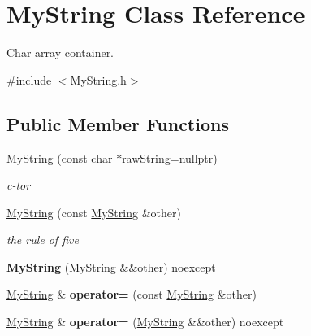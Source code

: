 \hypertarget{classMyString}{\section{My\-String Class Reference}
\label{classMyString}
}


Char array container.  




{\ttfamily \#include $<$My\-String.\-h$>$}

\subsection*{Public Member Functions}
\begin{DoxyCompactItemize}
\item 
\hypertarget{classMyString_a68d7c86c6e92b8c142c8addcfb8e320f}{\hyperlink{classMyString_a68d7c86c6e92b8c142c8addcfb8e320f}{My\-String} (const char $\ast$\hyperlink{classMyString_accc7aa9004aa6626167bf10df21c9c1a}{raw\-String}=nullptr)}\label{classMyString_a68d7c86c6e92b8c142c8addcfb8e320f}

\begin{DoxyCompactList}\small\item\em c-\/tor \end{DoxyCompactList}\item 
\hypertarget{classMyString_a261187457de0d93e0041845f41b0bd12}{\hyperlink{classMyString_a261187457de0d93e0041845f41b0bd12}{My\-String} (const \hyperlink{classMyString}{My\-String} \&other)}\label{classMyString_a261187457de0d93e0041845f41b0bd12}

\begin{DoxyCompactList}\small\item\em the rule of five \end{DoxyCompactList}\item 
\hypertarget{classMyString_aaed6b677d21961d1fe8cfec5a508dcea}{{\bfseries My\-String} (\hyperlink{classMyString}{My\-String} \&\&other) noexcept}\label{classMyString_aaed6b677d21961d1fe8cfec5a508dcea}

\item 
\hypertarget{classMyString_a53ccee069eec453de7a091b1bd2ebfa2}{\hyperlink{classMyString}{My\-String} \& {\bfseries operator=} (const \hyperlink{classMyString}{My\-String} \&other)}\label{classMyString_a53ccee069eec453de7a091b1bd2ebfa2}

\item 
\hypertarget{classMyString_a543bd0b53a2b46d1db45713e2c178853}{\hyperlink{classMyString}{My\-String} \& {\bfseries operator=} (\hyperlink{classMyString}{My\-String} \&\&other) noexcept}\label{classMyString_a543bd0b53a2b46d1db45713e2c178853}


\end{DoxyCompactItemize}
